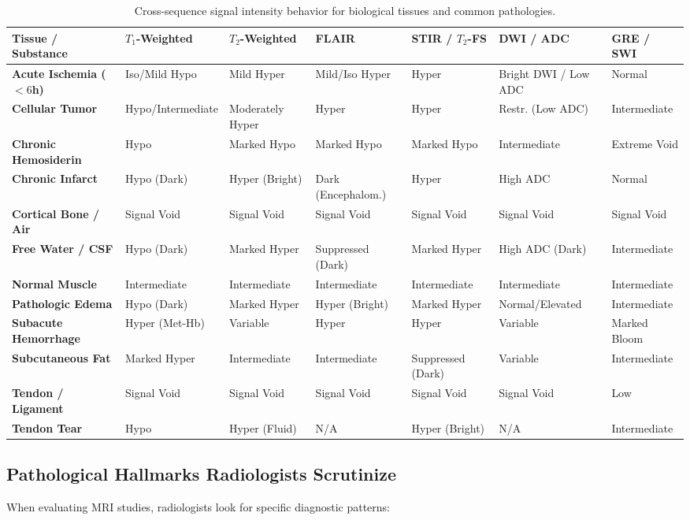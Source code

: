 \documentclass[11pt,a4paper]{article}
\begin{document}
\begin{table}[htbp]
\centering
\scriptsize
\renewcommand{\arraystretch}{1.25}
\begin{tabular}{p{2.8cm}p{1.9cm}p{1.9cm}p{2cm}p{2.1cm}p{2.2cm}p{1.9cm}}
\toprule
\textbf{Tissue / Substance} & \textbf{$T_1$-Weighted} & \textbf{$T_2$-Weighted} & \textbf{FLAIR} & \textbf{STIR / $T_2$-FS} & \textbf{DWI / ADC} & \textbf{GRE / SWI} \\
\midrule
\textbf{Acute Ischemia ($<6$h)} & Iso/Mild Hypo & Mild Hyper & Mild/Iso Hyper & Hyper & Bright DWI / Low ADC & Normal \\
\textbf{Cellular Tumor} & Hypo/Intermediate & Moderately Hyper & Hyper & Hyper & Restr. (Low ADC) & Intermediate \\
\textbf{Chronic Hemosiderin} & Hypo & Marked Hypo & Marked Hypo & Marked Hypo & Intermediate & Extreme Void \\
\textbf{Chronic Infarct} & Hypo (Dark) & Hyper (Bright) & Dark (Encephalom.) & Hyper & High ADC & Normal \\
\textbf{Cortical Bone / Air} & Signal Void & Signal Void & Signal Void & Signal Void & Signal Void & Signal Void \\
\textbf{Free Water / CSF} & Hypo (Dark) & Marked Hyper & Suppressed (Dark) & Marked Hyper & High ADC (Dark) & Intermediate \\
\textbf{Normal Muscle} & Intermediate & Intermediate & Intermediate & Intermediate & Intermediate & Intermediate \\
\textbf{Pathologic Edema} & Hypo (Dark) & Marked Hyper & Hyper (Bright) & Marked Hyper & Normal/Elevated & Intermediate \\
\textbf{Subacute Hemorrhage} & Hyper (Met-Hb) & Variable & Hyper & Hyper & Variable & Marked Bloom \\
\textbf{Subcutaneous Fat} & Marked Hyper & Intermediate & Intermediate & Suppressed (Dark) & Variable & Intermediate \\
\textbf{Tendon / Ligament} & Signal Void & Signal Void & Signal Void & Signal Void & Signal Void & Low \\
\textbf{Tendon Tear} & Hypo & Hyper (Fluid) & N/A & Hyper (Bright) & N/A & Intermediate \\
\bottomrule
\end{tabular}
\caption{Cross-sequence signal intensity behavior for biological tissues and common pathologies.}
\label{tab:mri_signal_matrix}
\end{table}

\subsection{Pathological Hallmarks Radiologists Scrutinize}
When evaluating MRI studies, radiologists look for specific diagnostic patterns:
\end{document}
